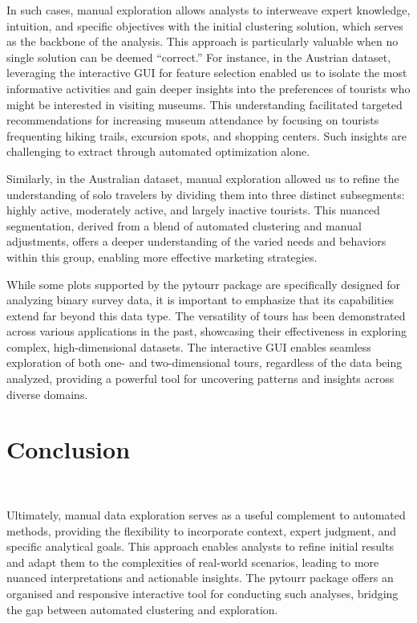 \documentclass[article]{ajs}
\begin{document}
In such cases, manual exploration allows analysts to interweave expert knowledge, intuition, and specific objectives with the initial clustering solution, which serves as the backbone of the analysis. This approach is particularly valuable when no single solution can be deemed “correct.” For instance, in the Austrian dataset, leveraging the interactive GUI for feature selection enabled us to isolate the most informative activities and gain deeper insights into the preferences of tourists who might be interested in visiting museums. This understanding facilitated targeted recommendations for increasing museum attendance by focusing on tourists frequenting hiking trails, excursion spots, and shopping centers. Such insights are challenging to extract through automated optimization alone.

Similarly, in the Australian dataset, manual exploration allowed us to refine the understanding of solo travelers by dividing them into three distinct subsegments: highly active, moderately active, and largely inactive tourists. This nuanced segmentation, derived from a blend of automated clustering and manual adjustments, offers a deeper understanding of the varied needs and behaviors within this group, enabling more effective marketing strategies.

While some plots supported by the pytourr package are specifically designed for analyzing binary survey data, it is important to emphasize that its capabilities extend far beyond this data type. The versatility of tours has been demonstrated across various applications in the past, showcasing their effectiveness in exploring complex, high-dimensional datasets. The interactive GUI enables seamless exploration of both one- and two-dimensional tours, regardless of the data being analyzed, providing a powerful tool for uncovering patterns and insights across diverse domains.


\section{Conclusion}~\label{conclusion}

Ultimately, manual data exploration serves as a useful complement to automated methods, providing the flexibility to incorporate context, expert judgment, and specific analytical goals. This approach enables analysts to refine initial results and adapt them to the complexities of real-world scenarios, leading to more nuanced interpretations and actionable insights. The pytourr package offers an organised and responsive interactive tool for conducting such analyses, bridging the gap between automated clustering and exploration.
\end{document}
